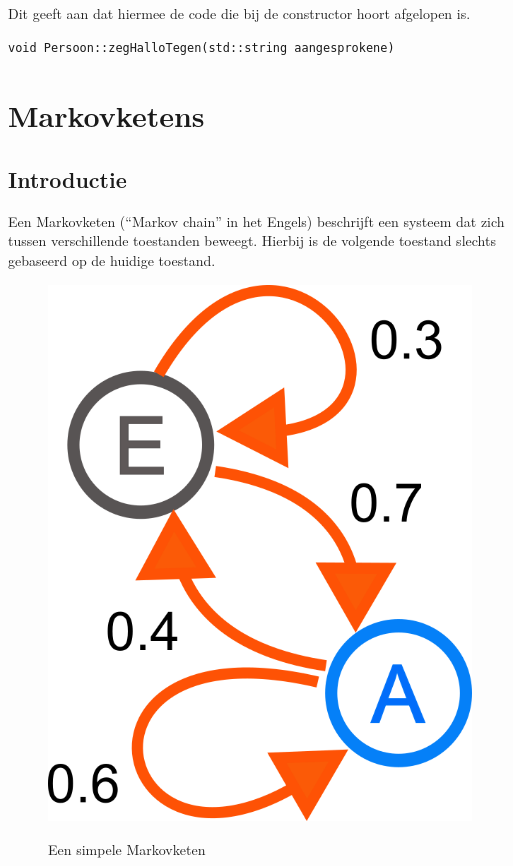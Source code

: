 \documentclass{article}
\begin{document}
Dit geeft aan dat hiermee de code die bij de constructor hoort afgelopen is.

\begin{lstlisting}[frame=none]
void Persoon::zegHalloTegen(std::string aangesprokene)
\end{lstlisting}

\newpage

\section{Markovketens}

\subsection{Introductie}

Een Markovketen (“Markov chain” in het Engels) beschrijft een systeem dat zich tussen verschillende toestanden beweegt. Hierbij is de volgende toestand slechts gebaseerd op de huidige toestand.

\begin{figure}[h!]
  \centering
  \includegraphics[scale=0.5]{markovketens.png}
  \label{fig:markovketens}
  \caption{Een simpele Markovketen\cite{markovketen}}
\end{figure}
\end{document}
